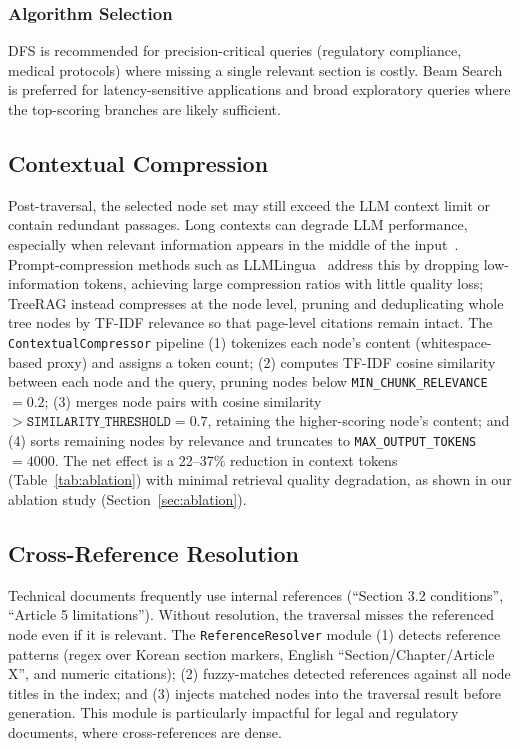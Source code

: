 \documentclass[sigconf,review,anonymous]{acmart}
\begin{document}
\subsubsection{Algorithm Selection}
DFS is recommended for precision-critical queries (regulatory compliance,
medical protocols) where missing a single relevant section is costly. Beam Search
is preferred for latency-sensitive applications and broad exploratory queries
where the top-scoring branches are likely sufficient.

\subsection{Contextual Compression}
Post-traversal, the selected node set may still exceed the LLM context limit or
contain redundant passages. Long contexts can degrade LLM performance, especially
when relevant information appears in the middle of the
input~\cite{liu2024lostmiddle}. Prompt-compression methods such as
LLMLingua~\cite{jiang2023llmlingua} address this by dropping low-information
tokens, achieving large compression ratios with little quality loss; TreeRAG
instead compresses at the node level, pruning and deduplicating whole tree nodes
by TF-IDF relevance so that page-level citations remain intact. The
\texttt{ContextualCompressor} pipeline (1) tokenizes each node's content
(whitespace-based proxy) and assigns a token count; (2) computes TF-IDF cosine
similarity between each node and the query, pruning nodes below
\texttt{MIN\_CHUNK\_RELEVANCE}$=0.2$; (3) merges node pairs with cosine
similarity $>\texttt{SIMILARITY\_THRESHOLD}=0.7$, retaining the higher-scoring
node's content; and (4) sorts remaining nodes by relevance and truncates to
\texttt{MAX\_OUTPUT\_TOKENS}$=4000$. The net effect is a 22--37\% reduction in
context tokens (Table~\ref{tab:ablation}) with minimal retrieval quality
degradation, as shown in our ablation study (Section~\ref{sec:ablation}).

\subsection{Cross-Reference Resolution}
Technical documents frequently use internal references (``Section 3.2
conditions'', ``Article 5 limitations''). Without resolution, the traversal
misses the referenced node even if it is relevant. The \texttt{ReferenceResolver}
module (1) detects reference patterns (regex over Korean section markers, English
``Section/Chapter/Article X'', and numeric citations); (2) fuzzy-matches detected
references against all node titles in the index; and (3) injects matched nodes
into the traversal result before generation. This module is particularly
impactful for legal and regulatory documents, where cross-references are dense.
\end{document}
